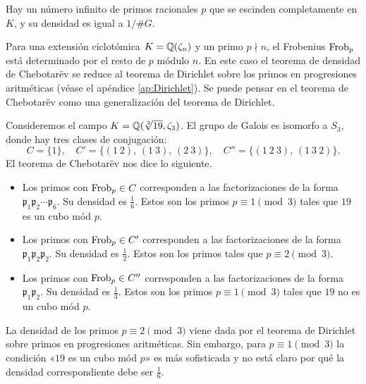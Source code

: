 \begin{corolario}
  Hay un número infinito de primos racionales $p$ que se escinden completamente
  en $K$, y su densidad es igual a $1/\#G$.
\end{corolario}

\begin{ejemplo}
  Para una extensión ciclotómica $K = \mathbb{Q} (\zeta_n)$ y un primo $p \nmid n$,
  el Frobenius $\operatorname{Frob}_p$ está determinado por el resto de $p$ módulo $n$.
  En este caso el teorema de densidad de Chebotarëv se reduce al teorema de
  Dirichlet sobre los primos en progresiones aritméticas (véase el apéndice
  \ref{ap:Dirichlet}). Se puede pensar en el teorema de Chebotarëv como una
  generalización del teorema de Dirichlet.
\end{ejemplo}

\begin{ejemplo}
  Consideremos el campo $K = \mathbb{Q} (\sqrt[3]{19}, \zeta_3)$. El grupo de Galois
  es isomorfo a $S_3$, donde hay tres clases de conjugación:
  \[ C = \{ 1 \}, \quad
     C' = \{ (1~2), \, (1~3), \, (2~3) \}, \quad
     C'' = \{ (1~2~3), \, (1~3~2) \}. \]
  El teorema de Chebotarëv nos dice lo siguiente.
  \begin{itemize}
  \item Los primos con $\operatorname{Frob}_p \in C$ corresponden a las factorizaciones
    de la forma $\mathfrak{p}_1\mathfrak{p}_2\cdots \mathfrak{p}_6$. Su densidad
    es $\frac{1}{6}$. Estos son los primos $p \equiv 1 \pmod{3}$ tales que
    $19$ es un cubo mód $p$.

  \item Los primos con $\operatorname{Frob}_p \in C'$ corresponden a las factorizaciones
    de la forma $\mathfrak{p}_1\mathfrak{p}_2\mathfrak{p}_2$.
    Su densidad es $\frac{1}{2}$. Estos son los primos tales que
    $p \equiv 2\pmod{3}$.

  \item Los primos con $\operatorname{Frob}_p \in C''$ corresponden a las factorizaciones
    de la forma $\mathfrak{p}_1\mathfrak{p}_2$. Su densidad es
    $\frac{1}{3}$. Estos son los primos $p \equiv 1 \pmod{3}$ tales que
    $19$ no es un cubo mód $p$.
  \end{itemize}

  La densidad de los primos $p \equiv 2\pmod{3}$ viene dada por el teorema de
  Dirichlet sobre primos en progresiones aritméticas. Sin embargo, para
  $p \equiv 1\pmod{3}$ la condición «$19$ es un cubo mód $p$» es más sofisticada
  y no está claro por qué la densidad correspondiente debe ser $\frac{1}{6}$.


\end{ejemplo}
